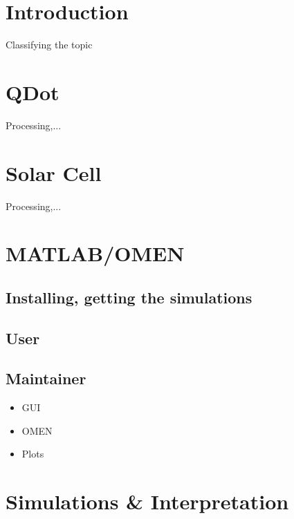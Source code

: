 \documentclass{article}
\begin{document}
	\section{Introduction}
		Classifying the topic
	\section{QDot}
		Processing,...
	\section{Solar Cell}
		Processing,...
	\section{MATLAB/OMEN}
		\subsection{Installing, getting the simulations}
		\subsection{User}
		\subsection{Maintainer}
			\begin{itemize}
			\itemsep 0pt
				\item GUI
				\item OMEN
				\item Plots
			\end{itemize}
	\section{Simulations \& Interpretation}
\end{document}
